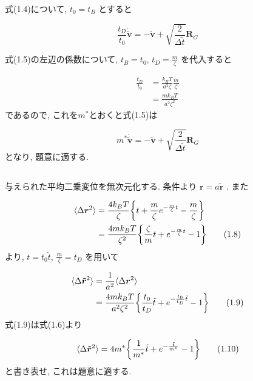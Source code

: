 \documentclass[a4paper,dvipdfmx]{jarticle}
\begin{document}
\noindent
式(1.4)について, $t_0=t_B$ とすると

\begin{equation}
    \frac{t_D}{t_0} \bm{\dot{\tilde{v}}} = -\bm{\tilde{v}} 
    + \sqrt{\frac{2}{\Delta \tilde{t}}}\bm{R}_G \tag{1.5} 
\end{equation}

\noindent
式(1.5)の左辺の係数について, $t_B=t_0$, $t_D=\frac{m}{\zeta}$ を代入すると

\begin{align*}
    \frac{t_D}{t_0} &= \frac{k_BT}{a^2\zeta} \frac{m}{\zeta} \\
    &= \frac{mk_BT}{a^2\zeta^2} \tag{1.6}
\end{align*}
であるので, これを$m^*$とおくと式(1.5)は

\begin{equation}
    m^* \bm{\dot{\tilde{v}}} = -\bm{\tilde{v}} 
    + \sqrt{\frac{2}{\Delta \tilde{t}}}\bm{R}_G \tag{1.7} 
\end{equation}
となり, 題意に適する.


\subsection{}
\noindent
与えられた平均二乗変位を無次元化する.
条件より $\bm{r}=a\bm{\tilde{r}}$ .
また

\begin{align*}
    \langle \Delta \bm{r}^2 \rangle 
    &= \frac{4k_BT}{\zeta} \qty{t + \frac{m}{\zeta} e^{-\frac{m}{\zeta}t} - \frac{m}{\zeta}} \\
    &= \frac{4mk_BT}{\zeta^2} \qty{\frac{\zeta}{m} t + e^{-\frac{m}{\zeta}t} - 1} \tag{1.8}
\end{align*}
より, $t=t_0\tilde{t}$, $\frac{m}{\zeta}=t_D$ を用いて

\begin{align*}
    \langle \Delta \bm{\tilde{r}}^2 \rangle &=  \frac{1}{a^2} \langle \Delta \bm{r}^2 \rangle \\
    &= \frac{4mk_BT}{a^2\zeta^2} \qty{\frac{t_0}{t_D} \tilde{t} + e^{-\frac{t_0}{t_D} \tilde{t}} - 1} \tag{1.9}
\end{align*}
式(1.9)は式(1.6)より

\begin{equation}
        \langle \Delta \bm{\tilde{r}}^2 \rangle 
        = 4m^* \qty{\frac{1}{m^*} \tilde{t} + e^{-\frac{\tilde{t}}{m^*}} - 1} \tag{1.10}
\end{equation}
と書き表せ, これは題意に適する.
\end{document}
